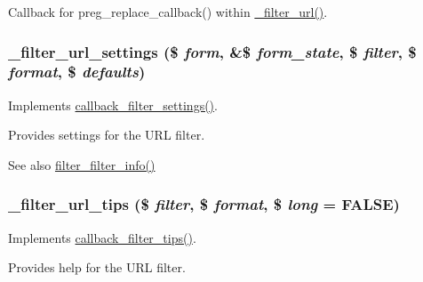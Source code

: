Callback for preg\_\-replace\_\-callback() within \hyperlink{group__standard__filters_ga3014977a8aa365044b11f94abf04f313}{\_\-filter\_\-url()}. \hypertarget{group__standard__filters_ga6e9a9c137838e2ab2b0f6f2623bed95f}{
\subsubsection[{\_\-filter\_\-url\_\-settings}]{\setlength{\rightskip}{0pt plus 5cm}\_\-filter\_\-url\_\-settings (\$ {\em form}, \/  \&\$ {\em form\_\-state}, \/  \$ {\em filter}, \/  \$ {\em format}, \/  \$ {\em defaults})}}
\label{group__standard__filters_ga6e9a9c137838e2ab2b0f6f2623bed95f}
Implements \hyperlink{group__callbacks_gac9ccfeb3980f8eaa8b3717e98a1e48e2}{callback\_\-filter\_\-settings()}.

Provides settings for the URL filter.

\begin{DoxySeeAlso}{See also}
\hyperlink{group__standard__filters_ga38089b90576e648c56228ee99c9c1767}{filter\_\-filter\_\-info()} 
\end{DoxySeeAlso}
\hypertarget{group__standard__filters_ga7f7a390abfeefdfc03ad377037edfb18}{
\subsubsection[{\_\-filter\_\-url\_\-tips}]{\setlength{\rightskip}{0pt plus 5cm}\_\-filter\_\-url\_\-tips (\$ {\em filter}, \/  \$ {\em format}, \/  \$ {\em long} = {\ttfamily FALSE})}}
\label{group__standard__filters_ga7f7a390abfeefdfc03ad377037edfb18}
Implements \hyperlink{group__callbacks_gabe5ee7c795e0adac0bccb8061006949e}{callback\_\-filter\_\-tips()}.

Provides help for the URL filter.

